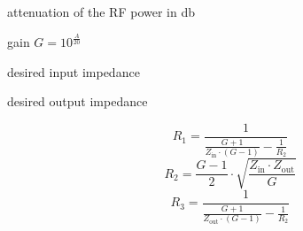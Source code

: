\documentclass[varwidth,convert={density=300,size=800x800,outext=.png}]{standalone}
\newcommand{\Zin}{Z_\mathrm{in}}
\newcommand{\Zout}{Z_\mathrm{out}}
\begin{document}
\begin{description}[labelindent=0pt,labelsep=10pt]
\item[$A$] attenuation of the RF power in \si{\decibel}
\item[$G$] gain $G = 10^{\frac{A}{20}}$ 
\item[$\Zin$] desired input impedance
\item[$\Zout$] desired output impedance
\end{description}

\[R_1 = \frac{1}{\frac{G+1}{\Zin \cdot (G-1)} - \frac{1}{R_2}}\]
\[R_2 = \frac{G-1}{2}  \cdot \sqrt{\frac{\Zin \cdot \Zout}{G}}\]
\[R_3 = \frac{1}{\frac{G+1}{\Zout \cdot (G-1)} - \frac{1}{R_2}}\]
\end{document}
